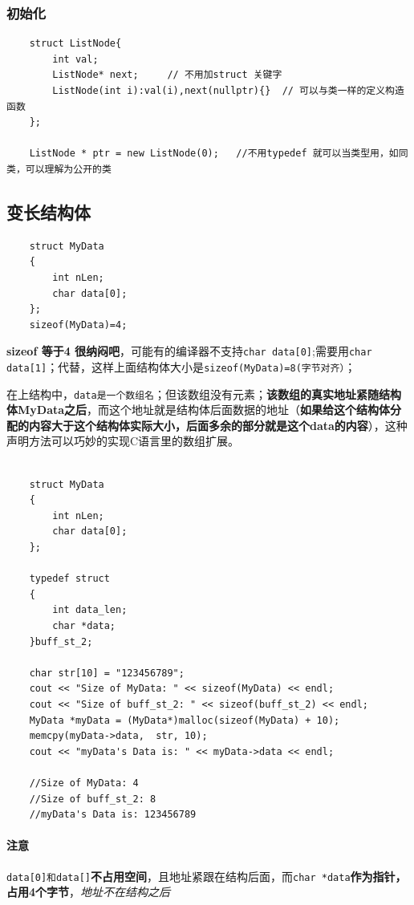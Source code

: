 \documentclass[UTF8,a4paper,12pt]{ctexbook} %
\begin{document}
		    \subsubsection{初始化}
			\begin{lstlisting}
	struct ListNode{
		int val;
		ListNode* next;		// 不用加struct 关键字
		ListNode(int i):val(i),next(nullptr){}	// 可以与类一样的定义构造函数
	};
	
	ListNode * ptr = new ListNode(0);	//不用typedef 就可以当类型用，如同类，可以理解为公开的类			
			\end{lstlisting} 
         
         
         \subsection{变长结构体}
         	\begin{lstlisting}
	struct MyData 
	{
	    int nLen;
	    char data[0];
	};
	sizeof(MyData)=4;
         	\end{lstlisting}
         
       \textbf{sizeof 等于4 很纳闷吧}，可能有的编译器不支持\verb|char data[0]|;需要用\verb|char data[1]|；代替，这样上面结构体大小是\verb|sizeof(MyData)=8(字节对齐）|；  
       
       在上结构中，\verb|data是一个数组名|；但该数组没有元素；\textbf{该数组的真实地址紧随结构体MyData之后}，而这个地址就是结构体后面数据的地址（\textbf{如果给这个结构体分配的内容大于这个结构体实际大小，后面多余的部分就是这个data的内容}），这种声明方法可以巧妙的实现C语言里的数组扩展。
       
       \begin{lstlisting}
	
	struct MyData 
	{
	    int nLen;
	    char data[0];		
	};
	
	typedef struct
	{
	    int data_len;
	    char *data;
	}buff_st_2;
	
	char str[10] = "123456789";
	cout << "Size of MyData: " << sizeof(MyData) << endl;
	cout << "Size of buff_st_2: " << sizeof(buff_st_2) << endl;
	MyData *myData = (MyData*)malloc(sizeof(MyData) + 10);
	memcpy(myData->data,  str, 10);
	cout << "myData's Data is: " << myData->data << endl;
	
	//Size of MyData: 4
	//Size of buff_st_2: 8
	//myData's Data is: 123456789  
       \end{lstlisting}
       
       
       \paragraph{注意}
       		\verb|data[0]和data[]|\textbf{不占用空间}，且地址紧跟在结构后面，而\verb|char *data|\textbf{作为指针，占用4个字节}，\textit{地址不在结构之后}
       	
\end{document}
